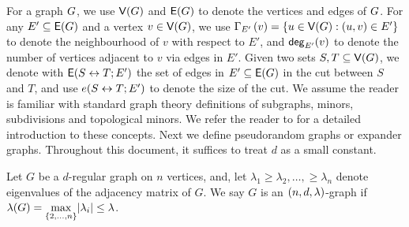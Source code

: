 \documentclass[11pt]{article}
\begin{document}
For a graph $G$, we use $\mathsf{V}(G)$ and $\mathsf{E}(G)$ to denote the vertices and edges of $G$.
For any $E' \subseteq \mathsf{E}(G)$ and a vertex $v \in \mathsf{V}(G)$, we use $\Gamma_{E'}\left(v\right) = \{ u \in \mathsf{V}(G) : (u,v) \in E' \}$ to denote the neighbourhood of $v$ with respect to $E'$, and $\mathsf{deg}_{E'}(v)$ to denote the number of vertices adjacent to $v$ via edges in $E'$.
Given two sets $S, T \subseteq \mathsf{V}(G)$, we denote with $\mathsf{E}(S \leftrightarrow T; E')$ the set of edges in $E' \subseteq \mathsf{E}(G)$ in the cut between $S$ and $T$, and use $e(S \leftrightarrow T; E')$ to denote the size of the cut.
We assume the reader is familiar with standard graph theory definitions of subgraphs, minors, subdivisions and  topological minors.
We refer the reader to \citep{bollobas2012graph} for a detailed introduction to these concepts.
Next we define pseudorandom graphs or expander graphs.
Throughout this document, it suffices to treat $d$ as a small constant.

\begin{definition}\label{def:expander-graphs}
Let $G$ be a $d$-regular graph on $n$ vertices, and, let $\lambda_1 \geq \lambda_2, \dots, \geq \lambda_n$ denote eigenvalues of the adjacency matrix of $G$.
We say $G$ is an $(n, d, \lambda)$-graph if $\lambda(G) = \underset{{\{2, \dots, n\}}}{\max}|\lambda_i| \leq \lambda$.
\end{definition}
\end{document}
